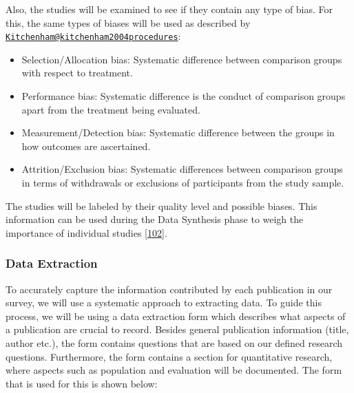 \documentclass[]{book}
\providecommand{\tightlist}{%
  \setlength{\itemsep}{0pt}\setlength{\parskip}{0pt}}
\begin{document}
Also, the studies will be examined to see if they contain any type of
bias. For this, the same types of biases will be used as described by
\href{mailto:Kitchenham@kitchenham2004procedures}{\nolinkurl{Kitchenham@kitchenham2004procedures}}:

\begin{itemize}
\tightlist
\item
  Selection/Allocation bias: Systematic difference between comparison
  groups with respect to treatment.
\item
  Performance bias: Systematic difference is the conduct of comparison
  groups apart from the treatment being evaluated.
\item
  Measurement/Detection bias: Systematic difference between the groups
  in how outcomes are ascertained.
\item
  Attrition/Exclusion bias: Systematic differences between comparison
  groups in terms of withdrawals or exclusions of participants from the
  study sample.
\end{itemize}

The studies will be labeled by their quality level and possible biases.
This information can be used during the Data Synthesis phase to weigh
the importance of individual studies
{[}\protect\hyperlink{ref-kitchenham2004procedures}{102}{]}.

\subsubsection{Data Extraction}\label{data-extraction}

To accurately capture the information contributed by each publication in
our survey, we will use a systematic approach to extracting data. To
guide this process, we will be using a data extraction form which
describes what aspects of a publication are crucial to record. Besides
general publication information (title, author etc.), the form contains
questions that are based on our defined research questions. Furthermore,
the form contains a section for quantitative research, where aspects
such as population and evaluation will be documented. The form that is
used for this is shown below:
\end{document}
